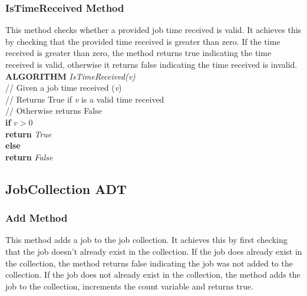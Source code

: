 \documentclass[12pt,a4paper]{article}
\begin{document}
			\subsubsection{IsTimeReceived Method}
				This method checks whether a provided job time received is valid. It achieves this by
				checking that the provided time received is greater than zero. If the time received is
				greater than zero, the method returns true indicating the time received is valid, otherwise
				it returns false indicating the time received is invalid.\\

				\textbf{ALGORITHM} \textit{IsTimeReceived(v)}\\
				\null\qquad\quad// Given a job time received (\textit{v})\\
				\null\qquad\quad// Returns True if \textit{v} is a valid time received\\
				\null\qquad\quad// Otherwise returns False\\
				\null\qquad\quad\textbf{if} \textit{$v > 0$}\\
				\null\qquad\qquad\textbf{return} \textit{True}\\
				\null\qquad\quad\textbf{else}\\
				\null\qquad\qquad\textbf{return} \textit{False}
		
		\newpage
			
		\subsection{JobCollection ADT}
			\subsubsection{Add Method}
				This method adds a job to the job collection. It achieves this by first checking that the job 
				doesn't already exist in the collection. If the job does already exist in the collection, the 
				method returns false indicating the job was not added to the collection. If the job does not 
				already exist in the collection, the method adds the job to the collection, increments the count 
				variable and returns true.\\
				
\end{document}
